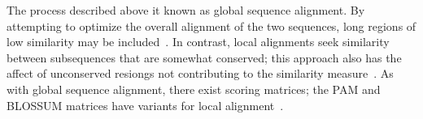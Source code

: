 The process described above it known as global sequence alignment. By attempting to optimize the overall alignment of the two sequences, long regions of low similarity may be included~\cite{needleman1970general}. In contrast, local alignments seek similarity between subsequences that are somewhat conserved; this approach also has the affect of unconserved resiongs not  contributing to the similarity measure~\cite{goad1982pattern, sellers1984pattern, smith1981comparison}. As with global sequence alignment, there exist scoring matrices; the PAM and BLOSSUM matrices have variants for local alignment~\cite{mount2008comparison}. 
